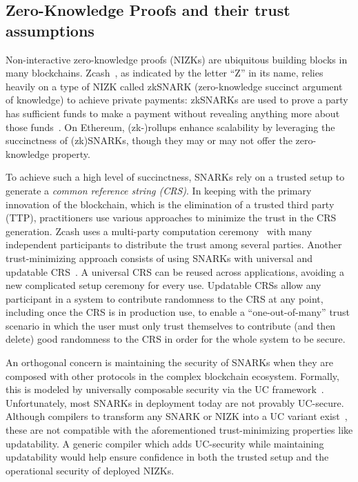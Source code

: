 \subsection{Zero-Knowledge Proofs and their trust assumptions}

Non-interactive zero-knowledge proofs (NIZKs) are ubiquitous building blocks in many blockchains. Zcash~\cite{zcash}, as indicated by the letter ``Z'' in its name, relies heavily on a type of NIZK called zkSNARK (zero-knowledge succinct argument of knowledge) to achieve private payments: zkSNARKs are used to prove a party has sufficient funds to make a payment without revealing anything more about those funds~\cite{SP:BCGGMT14}. On Ethereum, (zk-)rollups enhance scalability by leveraging the succinctness of (zk)SNARKs, though they may or may not offer the zero-knowledge property.

To achieve such a high level of succinctness, SNARKs rely on a trusted setup to generate a \emph{common reference string (CRS)}. In keeping with the primary innovation of the blockchain, which is the elimination of a trusted third party (TTP), practitioners use various approaches to minimize the trust in the CRS generation. Zcash uses a multi-party computation ceremony~\cite{zcash-ceremony} with many independent participants to distribute the trust among several parties. Another trust-minimizing approach consists of using SNARKs with universal and updatable CRS~\cite{C:GKMMM18,CCS:MBKM19,EC:CHMMVW20,EPRINT:GabWilCio19}. A universal CRS can be reused across applications, avoiding a new complicated setup ceremony for every use. Updatable CRSs allow any participant in a system to contribute randomness to the CRS at any point, including once the CRS is in production use, to enable a ``one-out-of-many'' trust scenario in which the user must only trust themselves to contribute (and then delete) good randomness to the CRS in order for the whole system to be secure.

An orthogonal concern is maintaining the security of SNARKs when they are composed with other protocols in the complex blockchain ecosystem. Formally, this is modeled by universally composable security via the UC framework~\cite{FOCS:Canetti01}. Unfortunately, most SNARKs in deployment today are not provably UC-secure. Although compilers to transform any SNARK or NIZK into a UC variant exist~\cite{EPRINT:KZMQCP15,EC:GKOPTT23}, these are not compatible with the aforementioned trust-minimizing properties like updatability. A generic compiler which adds UC-security while maintaining updatability would help ensure confidence in both the trusted setup and the operational security of deployed NIZKs.

